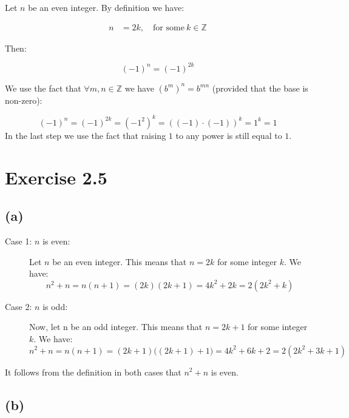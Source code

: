 \documentclass{article}
\begin{document}
Let $n$ be an even integer. By definition we have:

\begin{align*}
	n &= 2k, \quad \mbox{for some}\ k \in \mathbb{Z}
\end{align*}

Then:

\begin{equation*}
	(-1)^n = (-1)^{2k}
\end{equation*}

We use the fact that $\forall m,n \in \mathbb{Z}$ we have $(b^m)^n = b^{mn}$
(provided that the base is non-zero):

\begin{equation*}
	(-1)^n = (-1)^{2k} = (-1^2)^k = ((-1) \cdot (-1))^{k} = 1^k = 1
\end{equation*}
\noindent
In the last step we use the fact that raising $1$
to any power is still equal to $1$. 


\section*{Exercise 2.5}

\subsection*{(a)}

\begin{description}
    \item[Case 1: $n$ is even:]
	    Let $n$ be an even integer. This means that $n = 2k$ for some
	    integer $k$. We have:
	    \begin{equation*}
		n^2 + n = n(n+1) = (2k)(2k + 1) = 4k^{2} + 2k = 2(2k^2 + k)
	    \end{equation*}
    \item[Case 2: $n$ is odd:] Now, let n be an odd integer. This means that $n
	    = 2k + 1$ for some integer $k$. We have:
	    \begin{equation*}
		n^2 + n = n(n+1) = (2k +1)\big((2k + 1) + 1 \big) = 4k^2 + 6k + 2 = 2(2k^2 + 3k + 1)
	    \end{equation*}
\end{description}

It follows from the definition in both cases that $n^2 +n$ is even.


\subsection*{(b)}
\end{document}
